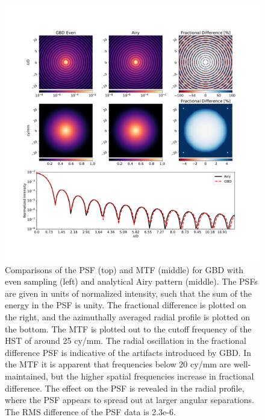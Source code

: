 \begin{figure}[H]
    \centering
    \includegraphics[width=\textwidth]{Airy_compare_Even.pdf}
    \caption{Comparisons of the PSF (top) and MTF (middle) for GBD with even sampling (left) and analytical Airy pattern (middle). The PSFs are given in units of normalized intensity, such that the sum of the energy in the PSF is unity. The fractional difference is plotted on the right, and the azimuthally averaged radial profile is plotted on the bottom. The MTF is plotted out to the cutoff frequency of the HST of around 25 cy/mm. The radial oscillation in the fractional difference PSF is indicative of the artifacts introduced by GBD. In the MTF it is apparent that frequencies below 20 cy/mm are well-maintained, but the higher spatial frequencies increase in fractional difference. The effect on the PSF is revealed in the radial profile, where the PSF appears to spread out at larger angular separations. The RMS difference of the PSF data is 2.3e-6.}
    \label{fig:airy_even}
\end{figure}

